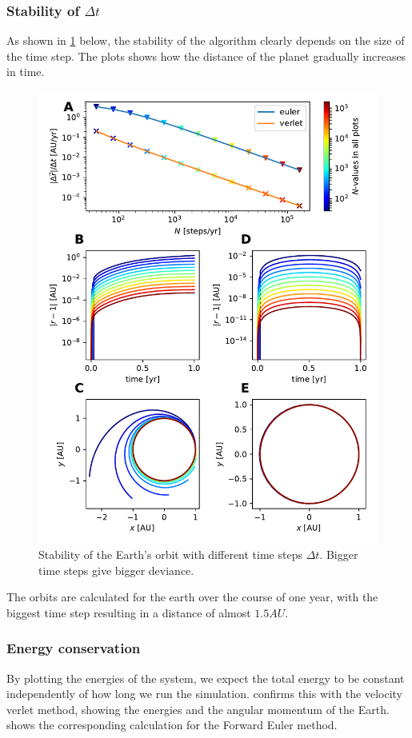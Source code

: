 \documentclass[10pt]{article}
\begin{document}
\begin{multicols}{2}
\subsubsection{Stability of $\Delta t$}
As shown in \cref{fig:stab_euler} below, the stability of the algorithm
clearly depends on the size of the time step. The plots shows how the
distance of the planet gradually increases in time.  

\begin{figure}[H]
    \centering
    \includegraphics[width=1.0\linewidth]{../results/stability.pdf}
    \caption{Stability of the Earth's orbit with different time steps $\Delta t$. Bigger time steps give bigger deviance.}
    \label{fig:stab_euler}
\end{figure}

The orbits are calculated for the earth over the course of one year, with
the biggest time step resulting in a distance of almost $1.5AU$.

\subsubsection{Energy conservation}
By plotting the energies of the system, we expect the total energy to be
constant independently of how long we run the simulation.
 confirms this with the velocity verlet method,
showing the energies and the angular momentum of the Earth.
 shows the corresponding calculation for the Forward
Euler method.


\end{multicols}
\end{document}
